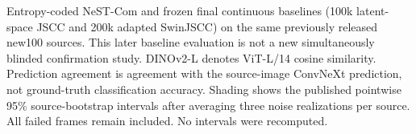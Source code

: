 Entropy-coded NeST-Com and frozen final continuous baselines (100k latent-space JSCC and 200k adapted SwinJSCC) on the same previously released new100 sources. This later baseline evaluation is not a new simultaneously blinded confirmation study. DINOv2-L denotes ViT-L/14 cosine similarity. Prediction agreement is agreement with the source-image ConvNeXt prediction, not ground-truth classification accuracy. Shading shows the published pointwise 95\% source-bootstrap intervals after averaging three noise realizations per source. All failed frames remain included. No intervals were recomputed.
